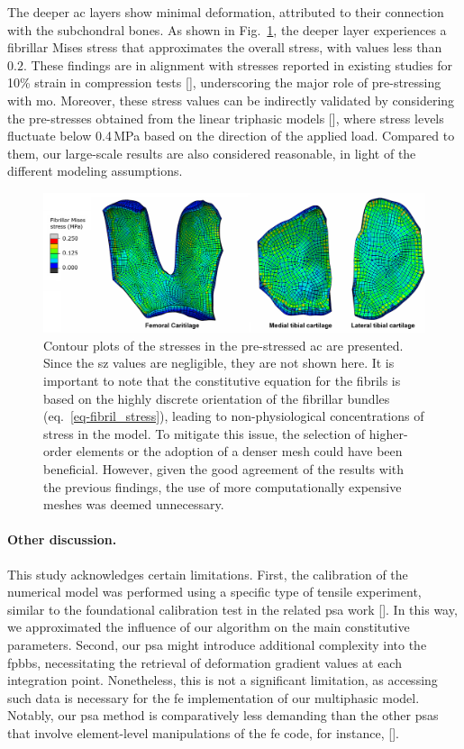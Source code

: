 \documentclass[12pt,a4paper]{report}
\begin{document}
The deeper \ac{ac} layers show minimal deformation, attributed to their connection with the subchondral bones. As shown in Fig.~\ref{fig:components}, the deeper layer experiences a fibrillar Mises stress that approximates the overall stress, with values less than $0.2$. These findings are in alignment with stresses reported in existing studies for 10\% strain in compression tests [\cite{sajjadinia2019}], underscoring the major role of pre-stressing with \ac{mo}. Moreover, these stress values can be indirectly validated by considering the pre-stresses obtained from the linear triphasic models [\cite{lai1991,setton1996}], where stress levels fluctuate below 0.4\,MPa based on the direction of the applied load. Compared to them, our large-scale results are also considered reasonable, in light of the different modeling assumptions.
%
\begin{figure}[H]\centering
\includegraphics[width=\textwidth]{img/components.jpg}
\caption{Contour plots of the stresses in the pre-stressed \ac{ac} are presented. Since the \ac{sz} values are negligible, they are not shown here. It is important to note that the constitutive equation for the fibrils is based on the highly discrete orientation of the fibrillar bundles (eq.~\ref{eq-fibril_stress}), leading to non-physiological concentrations of stress in the model. To mitigate this issue, the selection of higher-order elements or the adoption of a denser mesh could have been beneficial. However, given the good agreement of the results with the previous findings, the use of more computationally expensive meshes was deemed unnecessary.}
\label{fig:components}
\end{figure}

\paragraph{Other discussion.} This study acknowledges certain limitations. First, the calibration of the numerical model was performed using a specific type of tensile experiment, similar to the foundational calibration test in the related \ac{psa} work [\cite{wang2018}]. In this way, we approximated the influence of our algorithm on the main constitutive parameters. Second, our \ac{psa} might introduce additional complexity into the \ac{fpbbs}, necessitating the retrieval of deformation gradient values at each integration point. Nonetheless, this is not a significant limitation, as accessing such data is necessary for the \ac{fe} implementation of our multiphasic model. Notably, our \ac{psa} method is comparatively less demanding than the other \acp{psa} that involve element-level manipulations of the \ac{fe} code, for instance, [\cite{pierce2015,weisbecker2014}].
\end{document}
